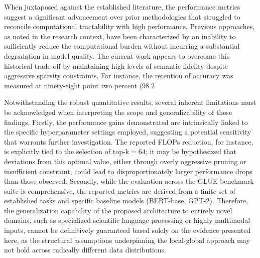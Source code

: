 \documentclass[12pt]{article}
\begin{document}
When juxtaposed against the established literature, the performance metrics suggest a significant advancement over prior methodologies that struggled to reconcile computational tractability with high performance. Previous approaches, as noted in the research context, have been characterized by an inability to sufficiently reduce the computational burden without incurring a substantial degradation in model quality. The current work appears to overcome this historical trade-off by maintaining high levels of semantic fidelity despite aggressive sparsity constraints. For instance, the retention of accuracy was measured at ninety-eight point two percent (98.2%

Notwithstanding the robust quantitative results, several inherent limitations must be acknowledged when interpreting the scope and generalizability of these findings. Firstly, the performance gains demonstrated are intrinsically linked to the specific hyperparameter settings employed, suggesting a potential sensitivity that warrants further investigation. The reported FLOPs reduction, for instance, is explicitly tied to the selection of $\text{top-k}=64$; it may be hypothesized that deviations from this optimal value, either through overly aggressive pruning or insufficient constraint, could lead to disproportionately larger performance drops than those observed. Secondly, while the evaluation across the GLUE benchmark suite is comprehensive, the reported metrics are derived from a finite set of established tasks and specific baseline models (BERT-base, GPT-2). Therefore, the generalization capability of the proposed architecture to entirely novel domains, such as specialized scientific language processing or highly multimodal inputs, cannot be definitively guaranteed based solely on the evidence presented here, as the structural assumptions underpinning the local-global approach may not hold across radically different data distributions.
\end{document}
